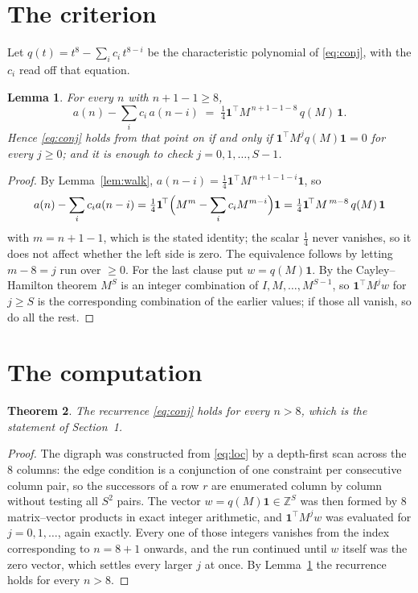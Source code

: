\documentclass[11pt,a4paper]{article}
\theoremstyle{plain}
\newtheorem{theorem}{Theorem}
\newtheorem{lemma}[theorem]{Lemma}
\theoremstyle{definition}
\begin{document}
\section{The criterion}

Let $q(t)=t^{8}-\sum_i c_i\,t^{8-i}$ be the characteristic polynomial of
\eqref{eq:conj}, with the $c_i$ read off that equation.

\begin{lemma}\label{lem:crit}
For every $n$ with $n+1-1\ge8$,
\[
a(n)-\sum_i c_i\,a(n-i)\;=\;\tfrac1{4}\mathbf{1}^{\!\top}M^{\,n+1-1-8}\,q(M)\,\mathbf{1} .
\]
Hence \eqref{eq:conj} holds from that point on if and only if
$\mathbf{1}^{\!\top}M^{j}q(M)\mathbf{1}=0$ for every $j\ge0$; and it is enough to check
$j=0,1,\dots,S-1$.
\end{lemma}

\begin{proof}
By Lemma~\ref{lem:walk}, $a(n-i)=\tfrac1{4}\mathbf{1}^{\!\top}M^{\,n+1-1-i}\mathbf{1}$, so
\[
a(n)-\sum_i c_i a(n-i)
=\tfrac1{4}\mathbf{1}^{\!\top}\Bigl(M^{m}-\sum_i c_i M^{m-i}\Bigr)\mathbf{1}
=\tfrac1{4}\mathbf{1}^{\!\top}M^{\,m-8}\,q(M)\,\mathbf{1}
\]
with $m=n+1-1$, which is the stated identity; the scalar $\tfrac1{4}$ never vanishes, so
it does not affect whether the left side is zero. The equivalence follows by letting
$m-8=j$ run over $\ge0$. For the last clause put $w=q(M)\mathbf{1}$. By the
Cayley--Hamilton theorem $M^{S}$ is an integer combination of $I,M,\dots,M^{S-1}$, so
$\mathbf{1}^{\!\top}M^{j}w$ for $j\ge S$ is the corresponding combination of the earlier
values; if those all vanish, so do all the rest.
\end{proof}

\section{The computation}

\begin{theorem}
The recurrence \eqref{eq:conj} holds for every $n>8$, which is the statement of
Section~1.
\end{theorem}

\begin{proof}
The digraph was constructed from \eqref{eq:loc} by a depth-first scan across the $8$
columns: the edge condition is a conjunction of one constraint per consecutive column
pair, so the successors of a row $r$ are enumerated column by column without testing all
$S^2$ pairs. The vector $w=q(M)\mathbf{1}\in\mathbb{Z}^{S}$ was then formed by $8$
matrix--vector products in exact integer arithmetic, and $\mathbf{1}^{\!\top}M^{j}w$ was
evaluated for $j=0,1,\dots$, again exactly. Every one of those integers vanishes from the
index corresponding to $n=8+1$ onwards, and the run continued until $w$ itself was the
zero vector, which settles every larger $j$ at once. By Lemma~\ref{lem:crit} the recurrence
holds for every $n>8$.
\end{proof}
\end{document}
